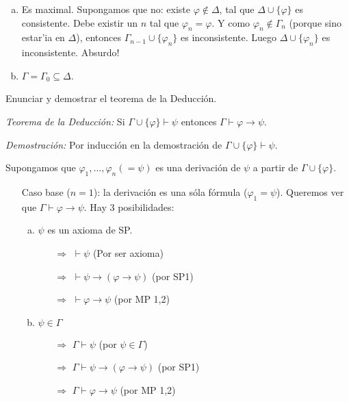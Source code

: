 \begin{questions}
\begin{solution}
\begin{enumerate}[(a)]
 \item Es maximal. Supongamos que no: existe $\varphi \notin \Delta$, tal que $\Delta\cup\{\varphi\}$ es consistente. Debe existir un $n$ tal que $\varphi_n = \varphi$. Y como $\varphi_n \notin \Gamma_n$ (porque sino estar'ia en $\Delta$), entonces $\Gamma_{n-1} \cup \{ \varphi_n \}$ es inconsistente. Luego $\Delta \cup \{ \varphi_n \}$ es inconsistente. Absurdo! 
 
 \item $\Gamma = \Gamma_0 \subseteq \Delta$.
\end{enumerate}

\end{solution}


\question Enunciar y demostrar el teorema de la Deducci\'on. 

\begin{solution}

 {\it Teorema de la Deducci\'on: } Si $\Gamma\cup\{\varphi\}\vdash\psi$ entonces $\Gamma \vdash \varphi\rightarrow\psi$.
  
 {\it Demostraci\'on: } Por inducci\'on en la demostraci\'on de $\Gamma\cup\{\varphi\}\vdash\psi$.
 
 Supongamos que $\varphi_1, \dots, \varphi_n(=\psi)$ es una derivaci\'on de $\psi$ a partir de $\Gamma\cup\{\varphi\}$.
 
 \begin{itemize}[\quad]
  \item[Caso base ($n=1$):] la derivaci\'on es una s\'ola f\'ormula ($\varphi_1=\psi$). Queremos ver que $\Gamma\vdash\varphi\rightarrow\psi$. Hay 3 posibilidades: 
  \begin{enumerate}[a)]
   \item $\psi$ es un axioma de SP. 
    \begin{enumerate}
      \item[$\Rightarrow$] $\vdash\psi$ \hfill (Por ser axioma) 
      \item[$\Rightarrow$] $\vdash\psi\rightarrow(\varphi\rightarrow\psi)$ \hfill (por SP1)
      \item[$\Rightarrow$] $\vdash\varphi\rightarrow\psi$ \hfill (por MP 1,2) 
    \end{enumerate}
    
   \item $\psi\in\Gamma$
   \begin{enumerate}
      \item[$\Rightarrow$] $\Gamma\vdash\psi$ \hfill (por $\psi\in\Gamma$)
      \item[$\Rightarrow$] $\Gamma\vdash\psi\rightarrow(\varphi\rightarrow\psi)$ \hfill (por SP1)
      \item[$\Rightarrow$] $\Gamma\vdash\varphi\rightarrow\psi$ \hfill (por MP 1,2)
    \end{enumerate}
    

\end{enumerate}
\end{itemize}
\end{solution}
\end{questions}
